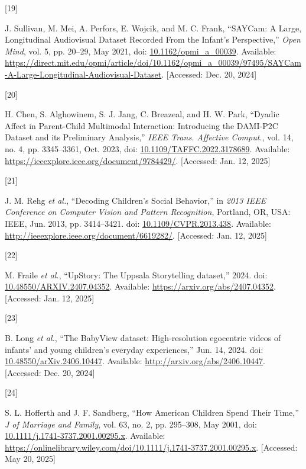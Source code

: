 \documentclass[
  man,floatsintext]{apa6}
\newlength{\cslhangindent}
\newlength{\csllabelwidth}
\newenvironment{CSLReferences}[2] %
 {\begin{list}{}{%
  \setlength{\itemindent}{0pt}
  \setlength{\leftmargin}{0pt}
  \setlength{\parsep}{0pt}
  \ifodd #1
   \setlength{\leftmargin}{\cslhangindent}
   \setlength{\itemindent}{-1\cslhangindent}
  \fi
  \setlength{\itemsep}{#2\baselineskip}}}
 {\end{list}}
\newcommand{\CSLLeftMargin}[1]{\parbox[t]{\csllabelwidth}{\strut#1\strut}}
\newcommand{\CSLRightInline}[1]{\parbox[t]{\linewidth - \csllabelwidth}{\strut#1\strut}}
\begin{document}
\begin{CSLReferences}{0}{0}
\CSLLeftMargin{{[}19{]} }%
\CSLRightInline{J. Sullivan, M. Mei, A. Perfors, E. Wojcik, and M. C. Frank, {``{SAYCam}: {A Large}, {Longitudinal Audiovisual Dataset Recorded From} the {Infant}'s {Perspective},''} \emph{Open Mind}, vol. 5, pp. 20--29, May 2021, doi: \href{https://doi.org/10.1162/opmi_a_00039}{10.1162/opmi\_a\_00039}. Available: \url{https://direct.mit.edu/opmi/article/doi/10.1162/opmi_a_00039/97495/SAYCam-A-Large-Longitudinal-Audiovisual-Dataset}. {[}Accessed: Dec. 20, 2024{]}}

\CSLLeftMargin{{[}20{]} }%
\CSLRightInline{H. Chen, S. Alghowinem, S. J. Jang, C. Breazeal, and H. W. Park, {``Dyadic {Affect} in {Parent-Child Multimodal Interaction}: {Introducing} the {DAMI-P2C Dataset} and its {Preliminary Analysis},''} \emph{IEEE Trans. Affective Comput.}, vol. 14, no. 4, pp. 3345--3361, Oct. 2023, doi: \href{https://doi.org/10.1109/TAFFC.2022.3178689}{10.1109/TAFFC.2022.3178689}. Available: \url{https://ieeexplore.ieee.org/document/9784429/}. {[}Accessed: Jan. 12, 2025{]}}

\CSLLeftMargin{{[}21{]} }%
\CSLRightInline{J. M. Rehg \emph{et al.}, {``Decoding {Children}'s {Social Behavior},''} in \emph{2013 {IEEE Conference} on {Computer Vision} and {Pattern Recognition}}, Portland, OR, USA: IEEE, Jun. 2013, pp. 3414--3421. doi: \href{https://doi.org/10.1109/CVPR.2013.438}{10.1109/CVPR.2013.438}. Available: \url{http://ieeexplore.ieee.org/document/6619282/}. {[}Accessed: Jan. 12, 2025{]}}

\CSLLeftMargin{{[}22{]} }%
\CSLRightInline{M. Fraile \emph{et al.}, {``{UpStory}: The {Uppsala Storytelling} dataset,''} 2024. doi: \href{https://doi.org/10.48550/ARXIV.2407.04352}{10.48550/ARXIV.2407.04352}. Available: \url{https://arxiv.org/abs/2407.04352}. {[}Accessed: Jan. 12, 2025{]}}

\CSLLeftMargin{{[}23{]} }%
\CSLRightInline{B. Long \emph{et al.}, {``The {BabyView} dataset: {High-resolution} egocentric videos of infants' and young children's everyday experiences,''} Jun. 14, 2024. doi: \href{https://doi.org/10.48550/arXiv.2406.10447}{10.48550/arXiv.2406.10447}. Available: \url{http://arxiv.org/abs/2406.10447}. {[}Accessed: Dec. 20, 2024{]}}

\CSLLeftMargin{{[}24{]} }%
\CSLRightInline{S. L. Hofferth and J. F. Sandberg, {``How {American Children Spend Their Time},''} \emph{J of Marriage and Family}, vol. 63, no. 2, pp. 295--308, May 2001, doi: \href{https://doi.org/10.1111/j.1741-3737.2001.00295.x}{10.1111/j.1741-3737.2001.00295.x}. Available: \url{https://onlinelibrary.wiley.com/doi/10.1111/j.1741-3737.2001.00295.x}. {[}Accessed: May 20, 2025{]}}


\end{CSLReferences}
\end{document}
